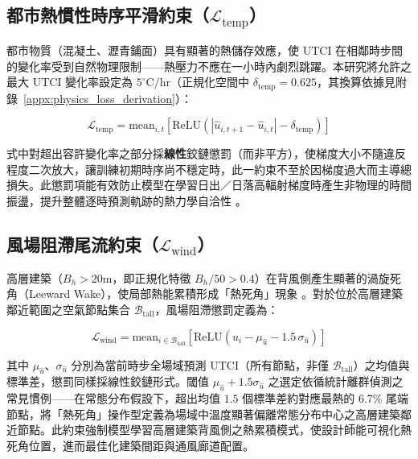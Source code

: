 \subsection{都市熱慣性時序平滑約束（$\mathcal{L}_{\text{temp}}$）}
\label{subsec:temporal_penalty}

都市物質（混凝土、瀝青鋪面）具有顯著的熱儲存效應，使 UTCI 在相鄰時步間的變化率受到自然物理限制——熱壓力不應在一小時內劇烈跳躍。本研究將允許之最大 UTCI 變化率設定為 $5^\circ\text{C/hr}$（正規化空間中 $\delta_{\text{temp}} = 0.625$，其換算依據見附錄~\ref{appx:physics_loss_derivation}）：

\begin{equation}
    \mathcal{L}_{\text{temp}} = \text{mean}_{i,t}\!\left[ \text{ReLU}\!\left( \left| \hat{u}_{i,t+1} - \hat{u}_{i,t} \right| - \delta_{\text{temp}} \right) \right]
    \label{eq:ltemp}
\end{equation}

式中對超出容許變化率之部分採\textbf{線性}鉸鏈懲罰（而非平方），使梯度大小不隨違反程度二次放大，讓訓練初期時序尚不穩定時，此一約束不至於因梯度過大而主導總損失。此懲罰項能有效防止模型在學習日出／日落高輻射梯度時產生非物理的時間振盪，提升整體逐時預測軌跡的熱力學自洽性 \citep{oskarsson2023modeling}。


\subsection{風場阻滯尾流約束（$\mathcal{L}_{\text{wind}}$）}
\label{subsec:wind_penalty}

高層建築（$B_h > 20\text{m}$，即正規化特徵 $B_h/50 > 0.4$）在背風側產生顯著的渦旋死角（Leeward Wake），使局部熱能累積形成「熱死角」現象 \citep{oke1987boundary}。對於位於高層建築鄰近範圍之空氣節點集合 $\mathcal{B}_{\text{tall}}$，風場阻滯懲罰定義為：

\begin{equation}
    \mathcal{L}_{\text{wind}} = \text{mean}_{i \in \mathcal{B}_{\text{tall}}}
    \left[ \text{ReLU}\!\left( \hat{u}_i - \mu_{\hat{u}} - 1.5\,\sigma_{\hat{u}} \right) \right]
    \label{eq:lwind}
\end{equation}

其中 $\mu_{\hat{u}}$、$\sigma_{\hat{u}}$ 分別為當前時步全場域預測 UTCI（所有節點，非僅 $\mathcal{B}_{\text{tall}}$）之均值與標準差，懲罰同樣採線性鉸鏈形式。閾值 $\mu_{\hat{u}} + 1.5\sigma_{\hat{u}}$ 之選定依循統計離群偵測之常見慣例——在常態分布假設下，超出均值 $1.5$ 個標準差約對應最熱的 6.7\% 尾端節點，將「熱死角」操作型定義為場域中溫度顯著偏離常態分布中心之高層建築鄰近節點。此約束強制模型學習高層建築背風側之熱累積模式，使設計師能可視化熱死角位置，進而最佳化建築間距與通風廊道配置。


